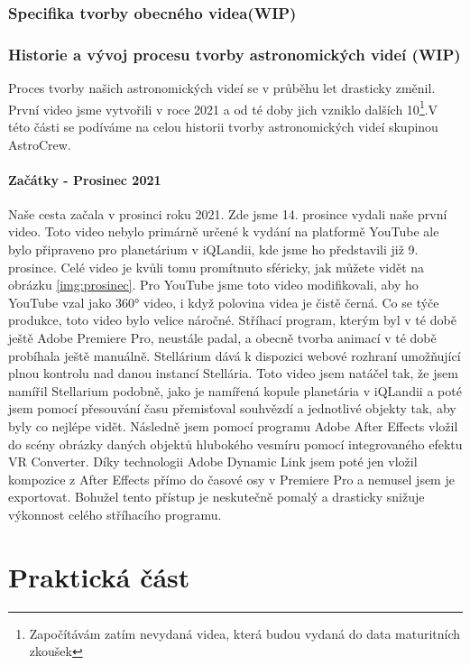 \documentclass[12pt,a4paper,titlepage]{article}
\begin{document}
\section{Specifika tvorby obecného videa(WIP)}
\section{Historie a vývoj procesu tvorby astronomických videí (WIP)}
Proces tvorby našich astronomických videí se v průběhu let drasticky změnil. První video jsme vytvořili v roce 2021 a od té doby jich vzniklo dalších 10\footnote{Započítávám zatím nevydaná videa, která budou vydaná do data maturitních zkoušek}.V této části se podíváme na celou historii tvorby astronomických videí skupinou AstroCrew.
\subsection{Začátky - Prosinec 2021}
Naše cesta začala v prosinci roku 2021. Zde jsme 14. prosince vydali naše první video. Toto video nebylo primárně určené k vydání na platformě YouTube ale bylo připraveno pro planetárium v iQLandii, kde jsme ho představili již 9. prosince. Celé video je kvůli tomu promítnuto sféricky, jak můžete vidět na obrázku \ref{img:prosinec}. Pro YouTube jsme toto video modifikovali, aby ho YouTube vzal jako 360° video, i když polovina videa je čistě černá. Co se týče produkce, toto video bylo velice náročné. Stříhací program, kterým byl v té době ještě Adobe Premiere Pro, neustále padal, a obecně tvorba animací v té době probíhala ještě manuálně. Stellárium dává k dispozici webové rozhraní umožňující plnou kontrolu nad danou instancí Stellária. Toto video jsem natáčel tak, že jsem namířil Stellarium podobně, jako je namířená kopule planetária v iQLandii a poté jsem pomocí přesouvání času přemisťoval souhvězdí a jednotlivé objekty tak, aby byly co nejlépe vidět. Následně jsem pomocí programu Adobe After Effects vložil do scény obrázky daných objektů hlubokého vesmíru pomocí integrovaného efektu VR Converter. Díky technologii Adobe Dynamic Link jsem poté jen vložil kompozice z After Effects přímo do časové osy v Premiere Pro a nemusel jsem je exportovat. Bohužel tento přístup je neskutečně pomalý a drasticky snižuje výkonnost celého stříhacího programu. 
\newpage
\part{Praktická část}
\newpage
\end{document}
